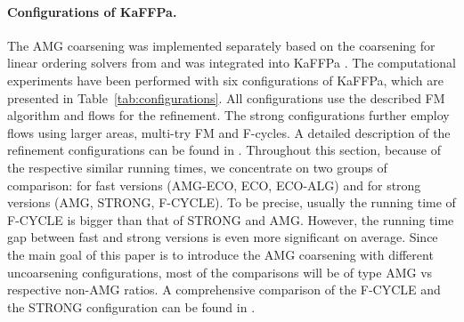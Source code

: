 \documentclass{llncs}
\begin{document}
\paragraph*{Configurations of KaFFPa.} 
The AMG coarsening was implemented separately based on the coarsening for linear ordering solvers from \cite{safro:relaxml} and was integrated into KaFFPa \cite{kaffpa}.
The computational experiments have been performed with six configurations of KaFFPa, which are presented in Table~\ref{tab:configurations}. 
All configurations use the described FM algorithm and flows for the refinement. The strong configurations further employ flows using larger areas, multi-try FM and F-cycles. A detailed description of the refinement configurations can be found in \cite{kaffpa}. Throughout this section, because of the respective similar running times, we concentrate on two groups of comparison: for fast versions (AMG-ECO, ECO, ECO-ALG) and for strong versions (AMG, STRONG, F-CYCLE). To be precise, usually
the running time of F-CYCLE is bigger than that of STRONG and AMG. However, the running time gap between fast and strong versions is even more significant on average. Since the main goal of this paper is to introduce the AMG coarsening with different uncoarsening configurations, most of the comparisons will be of type AMG vs respective non-AMG ratios. A comprehensive comparison of the F-CYCLE and the STRONG configuration can be found in \cite{kaffpa}. 
\end{document}
